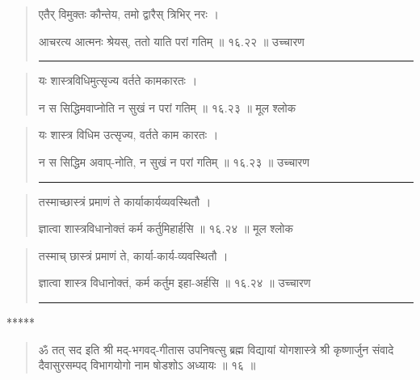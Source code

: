 \begin{quotation}

एतैर् विमुक्तः कौन्तेय, तमो द्वारैस् त्रिभिर् नरः ।  

आचरत्य आत्मनः श्रेयस्, ततो याति परां गतिम्‌  ॥ १६.२२ ॥  उच्चारण

\noindent\rule{16cm}{0.4pt} 
\end{quotation}


\begin{quotation}

यः शास्त्रविधिमुत्सृज्य वर्तते कामकारतः ।  

न स सिद्धिमवाप्नोति न सुखं न परां गतिम्‌  ॥ १६.२३ ॥  मूल श्लोक
\end{quotation}

\begin{quotation}

यः शास्त्र विधिम उत्सृज्य, वर्तते काम कारतः ।  

न स सिद्धिम अवाप्-नोति, न सुखं न परां गतिम्‌  ॥ १६.२३ ॥  उच्चारण

\noindent\rule{16cm}{0.4pt} 
\end{quotation}


\begin{quotation}
तस्माच्छास्त्रं प्रमाणं ते कार्याकार्यव्यवस्थितौ ।  

ज्ञात्वा शास्त्रविधानोक्तं कर्म कर्तुमिहार्हसि  ॥ १६.२४ ॥  मूल श्लोक
\end{quotation}

\begin{quotation}

तस्माच् छास्त्रं प्रमाणं ते, कार्या-कार्य-व्यवस्थितौ ।  

ज्ञात्वा शास्त्र विधानोक्तं, कर्म कर्तुम इहा-अर्हसि  ॥ १६.२४ ॥  उच्चारण

\noindent\rule{16cm}{0.4pt} 
\end{quotation}

\begin{center} ***** \end{center}

\begin{quotation}


ॐ तत् सद इति श्री मद्-भगवद्-गीतास उपनिषत्सु ब्रह्म विद्यायां योगशास्त्रे श्री कृष्णार्जुन संवादे  दैवासुरसम्पद् विभागयोगो नाम षोडशोऽ अध्यायः  ॥  १६  ॥ 
\end{quotation} 